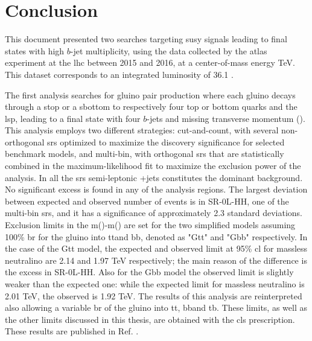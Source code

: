 \chapter*{Conclusion}

This document presented two searches targeting \gls{susy} signals leading to final states with 
high $b$-jet multiplicity, using the data collected by the \gls{atlas} experiment at the \gls{lhc} 
between 2015 and 2016, at a center-of-mass energy  \cmtre TeV. 
This dataset corresponds to an integrated luminosity of 36.1 \ifb.

The first analysis searches for gluino pair production where each gluino decays through a stop or a sbottom 
to respectively four top or bottom quarks and the \gls{lsp}, leading to a final state with four $b$-jets and 
missing transverse momentum (\met). 
This analysis employs two different strategies: cut-and-count, with several non-orthogonal \glspl{sr} optimized to 
maximize the discovery significance for selected benchmark models, and multi-bin, with orthogonal \glspl{sr} 
that are statistically combined in the maximum-likelihood fit 
to maximize the exclusion power of the analysis. 
In all the \glspl{sr} semi-leptonic \ttbar+jets constitutes the dominant background.
No significant excess is found in any of the analysis regions. 
The largest deviation between expected and observed number of events 
is in SR-0L-HH, one of the multi-bin \glspl{sr}, and it has a significance of approximately 
2.3 standard deviations. 
Exclusion limits in the m(\gluino)-m(\ninoone) are set for the two simplified models assuming 
100\% \gls{br} for the gluino into tt\ninoone and bb\ninoone, denoted as "Gtt" and "Gbb" respectively.
In the case of the Gtt model, the expected and observed limit at 95\% \gls{cl} for massless neutralino 
are 2.14 and 1.97 TeV respectively; the main reason of the difference is the excess in SR-0L-HH.
Also for the Gbb model the observed limit is slightly weaker than the expected one: 
while the expected limit for massless neutralino is 2.01 TeV, the observed is 1.92 TeV.
The results of this analysis are reinterpreted also allowing a variable \gls{br} of the gluino 
into tt\ninoone, bb\ninoone and tb\chinoonepm. 
These limits, as well as the other limits discussed in this thesis, are obtained with the \gls{cls} 
prescription. These results are published in Ref. \cite{Aaboud:2017hrg}.


